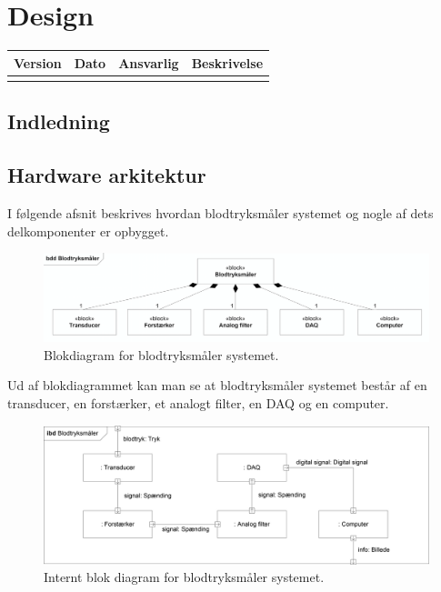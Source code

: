 \chapter{Design}

\begin{longtabu} to 
    Version &    Dato &    Ansvarlig &    Beskrivelse\\[-1ex]
    \midrule
    
\label{version_Systemark}
\end{longtabu}

\section{Indledning}

  
\section{Hardware arkitektur}
I følgende afsnit beskrives hvordan blodtryksmåler systemet og nogle af dets delkomponenter er opbygget.
\\
\begin{figure}[H]
	\centering
	\includegraphics[width=1\textwidth]{Figurer/Hardware/BDD}
	\caption{Blokdiagram for blodtryksmåler systemet.}\label{labelpic}
\end{figure}

Ud af blokdiagrammet kan man se at blodtryksmåler systemet består af en transducer, en forstærker, et analogt filter, en DAQ og en computer.\\
\begin{figure}[H]
	\centering
	\includegraphics[width=1\textwidth]{Figurer/Hardware/IBD}
	\caption{Internt blok diagram for blodtryksmåler systemet.}\label{labelpic}
\end{figure}

